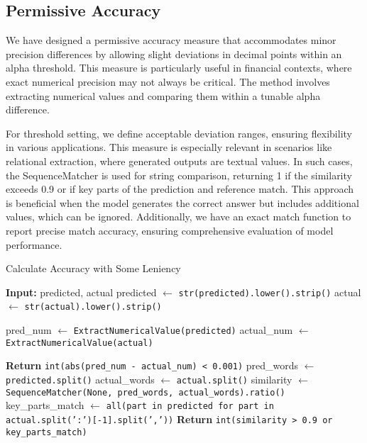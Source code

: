 \documentclass[logo,msc]{infthesis}           %
\begin{document}
\subsection{Permissive Accuracy}
We have designed a permissive accuracy measure that accommodates minor precision differences by allowing slight deviations in decimal points within an alpha threshold. This measure is particularly useful in financial contexts, where exact numerical precision may not always be critical. The method involves extracting numerical values and comparing them within a tunable alpha difference.

For threshold setting, we define acceptable deviation ranges, ensuring flexibility in various applications. This measure is especially relevant in scenarios like relational extraction, where generated outputs are textual values. In such cases, the SequenceMatcher is used for string comparison, returning 1 if the similarity exceeds 0.9 or if key parts of the prediction and reference match. This approach is beneficial when the model generates the correct answer but includes additional values, which can be ignored. Additionally, we have an exact match function to report precise match accuracy, ensuring comprehensive evaluation of model performance.
\begin{algorithm}
\caption{Calculate Accuracy with Some Leniency}
\label{alg:calculate_accuracy_permissive}
\begin{algorithmic}[1]
    \State \textbf{Input:} predicted, actual
    \State predicted $\gets$ \texttt{str(predicted).lower().strip()}
    \State actual $\gets$ \texttt{str(actual).lower().strip()}
    
    \State pred\_num $\gets$ \texttt{ExtractNumericalValue(predicted)}
    \State actual\_num $\gets$ \texttt{ExtractNumericalValue(actual)}
    
        \State \textbf{Return} \texttt{int(abs(pred\_num - actual\_num) < 0.001)}
    \Else
        \State pred\_words $\gets$ \texttt{predicted.split()}
        \State actual\_words $\gets$ \texttt{actual.split()}
        \State similarity $\gets$ \texttt{SequenceMatcher(None, pred\_words, actual\_words).ratio()}
        \State key\_parts\_match $\gets$ \texttt{all(part in predicted for part in actual.split(':')[-1].split(','))}
        \State \textbf{Return} \texttt{int(similarity > 0.9 or key\_parts\_match)}
    \EndIf
\EndFunction
\end{algorithmic}
\end{algorithm}
\end{document}
